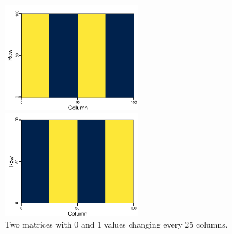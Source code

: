 \begin{figure}[htbp]
    \begin{minipage}[b]{0.45\linewidth}
      \centering
      \includegraphics[keepaspectratio, width=6.0cm]{figures/origi_spec/25stripe1.pdf}
    \end{minipage}
    \begin{minipage}[b]{0.45\linewidth}
      \centering
      \includegraphics[keepaspectratio, width=6.0cm]{figures/origi_spec/25stripe2.pdf}
    \end{minipage}
    \caption{Two matrices with 0 and 1 values changing every 25 columns.}
    \label{fig:25stripe_spec}
\end{figure}


